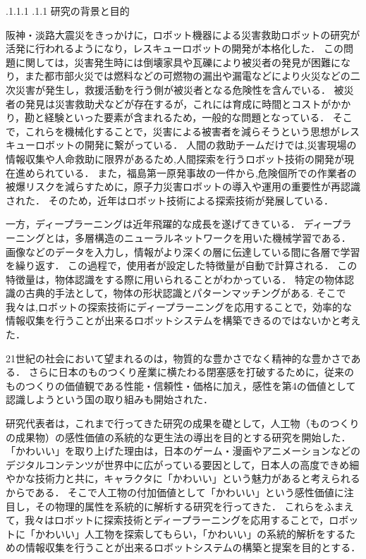\documentclass[a4paper, twocolumn]{jarticle}
\makeatletter
\def\section{\@startsection{section}{1}{\z@}%
 {.1\Cvs \@plus.1\Cdp \@minus.1\Cdp}%
 {.1\Cvs \@plus.1\Cdp}%
 {\normalfont\normalsize\bfseries}}
\makeatother
\begin{document}
\section{研究の背景と目的}

阪神・淡路大震災をきっかけに，ロボット機器による災害救助ロボットの研究が活発に行われるようになり，レスキューロボットの開発が本格化した．
この問題に関しては，災害発生時には倒壊家具や瓦礫により被災者の発見が困難になり，また都市部火災では燃料などの可燃物の漏出や漏電などにより火災などの二次災害が発生し，救援活動を行う側が被災者となる危険性を含んでいる．
被災者の発見は災害救助犬などが存在するが，これには育成に時間とコストがかかり，勘と経験といった要素が含まれるため，一般的な問題となっている．
そこで，これらを機械化することで，災害による被害者を減らそうという思想がレスキューロボットの開発に繋がっている．
人間の救助チームだけでは,災害現場の情報収集や人命救助に限界があるため,人間探索を行うロボット技術の開発が現在進められている．
また，福島第一原発事故の一件から,危険個所での作業者の被爆リスクを減らすために，原子力災害ロボットの導入や運用の重要性が再認識された．
そのため，近年はロボット技術による探索技術が発展している．

一方，ディープラーニングは近年飛躍的な成長を遂げてきている．
ディープラーニングとは，多層構造のニューラルネットワークを用いた機械学習である．
画像などのデータを入力し，情報がより深くの層に伝達している間に各層で学習を繰り返す．
この過程で，使用者が設定した特徴量が自動で計算される．
この特徴量は，物体認識をする際に用いられることがわかっている．
特定の物体認識の古典的手法として，物体の形状認識とパターンマッチングがある.
そこで我々は,ロボットの探索技術にディープラーニングを応用することで，効率的な情報収集を行うことが出来るロボットシステムを構築できるのではないかと考えた．

21世紀の社会において望まれるのは，物質的な豊かさでなく精神的な豊かさである．
さらに日本のものつくり産業に横たわる閉塞感を打破するために，従来のものつくりの価値観である性能・信頼性・価格に加え，感性を第4の価値として認識しようという国の取り組みも開始された．

研究代表者は，これまで行ってきた研究の成果を礎として，人工物（ものつくりの成果物）の感性価値の系統的な更生法の導出を目的とする研究を開始した．
「かわいい」を取り上げた理由は，日本のゲーム・漫画やアニメーションなどのデジタルコンテンツが世界中に広がっている要因として，日本人の高度できめ細やかな技術力と共に，キャラクタに「かわいい」という魅力があると考えられるからである．
そこで人工物の付加価値として「かわいい」という感性価値に注目し，その物理的属性を系統的に解析する研究を行ってきた\cite{thesis2}\cite{thesis3}．
これらをふまえて，我々はロボットに探索技術とディープラーニングを応用することで，ロボットに「かわいい」人工物を探索してもらい，「かわいい」の系統的解析をするための情報収集を行うことが出来るロボットシステムの構築と提案を目的とする．
\end{document}
